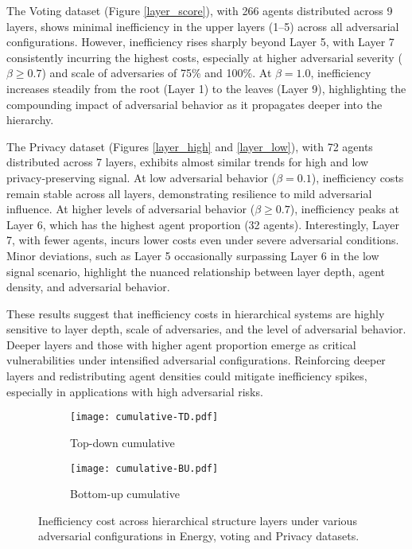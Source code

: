 \documentclass[journal]{IEEEtran}
\begin{document}
The Voting dataset (Figure \ref{layer_score}), with 266 agents distributed across 9 layers, shows minimal inefficiency in the upper layers (1--5) across all adversarial configurations. However, inefficiency rises sharply beyond Layer 5, with Layer 7 consistently incurring the highest costs, especially at higher adversarial severity ($\beta \geq 0.7$) and scale of adversaries of 75\% and 100\%. At $\beta=1.0$, inefficiency increases steadily from the root (Layer 1) to the leaves (Layer 9), highlighting the compounding impact of adversarial behavior as it propagates deeper into the hierarchy.

The Privacy dataset (Figures \ref{layer_high} and \ref{layer_low}), with 72 agents distributed across 7 layers, exhibits almost similar trends for high and low privacy-preserving signal. At low adversarial behavior ($\beta=0.1$), inefficiency costs remain stable across all layers, demonstrating resilience to mild adversarial influence. At higher levels of adversarial behavior ($\beta \geq 0.7$), inefficiency peaks at Layer 6, which has the highest agent proportion (32 agents). Interestingly, Layer 7, with fewer agents, incurs lower costs even under severe adversarial conditions. Minor deviations, such as Layer 5 occasionally surpassing Layer 6 in the low signal scenario, highlight the nuanced relationship between layer depth, agent density, and adversarial behavior.

These results suggest that inefficiency costs in hierarchical systems are highly sensitive to layer depth, scale of adversaries, and the level of adversarial behavior. Deeper layers and those with higher agent proportion emerge as critical vulnerabilities under intensified adversarial configurations. Reinforcing deeper layers and redistributing agent densities could mitigate inefficiency spikes, especially in applications with high adversarial risks.

\begin{figure*}[htbp]
  \centering
  \begin{subfigure}{0.98\textwidth}
    \centering
      \texttt{[image: cumulative-TD.pdf]}
      \caption{Top-down cumulative}
      \label{fig:TD cumulative}
      \end{subfigure}
      
    \begin{subfigure}{0.98\textwidth}
    \centering
      \texttt{[image: cumulative-BU.pdf]}
      \caption{Bottom-up cumulative}
      \label{fig:BU cumulative}
      \end{subfigure}
    \caption{Inefficiency cost across hierarchical structure layers under various adversarial configurations in Energy, voting and Privacy datasets.}
\label{fig:cumulative}
\end{figure*}
\end{document}
